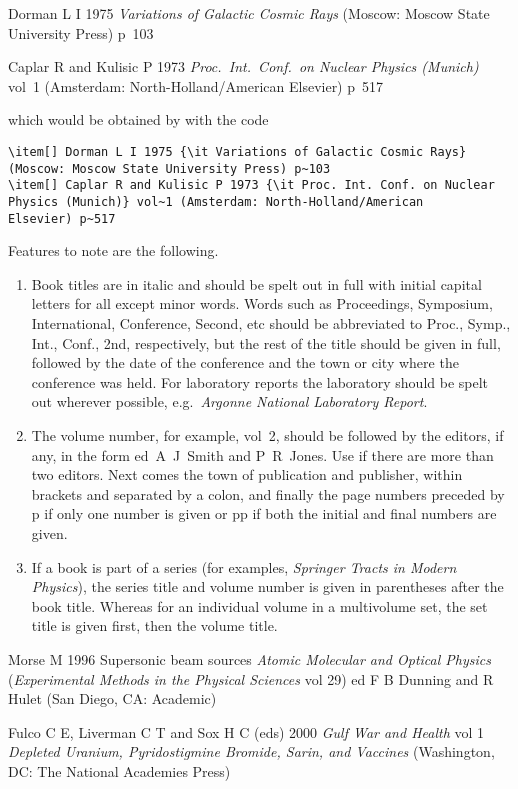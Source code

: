 \documentclass[12pt]{iopart}
\begin{document}
\smallskip
\begin{harvard}
\item[] Dorman L I 1975 {\it Variations of Galactic Cosmic Rays} 
(Moscow: Moscow State University Press) p~103
\item[] Caplar R and Kulisic P 1973 {\it Proc.\
Int.\ Conf.\ on Nuclear Physics (Munich)} vol~1 (Amsterdam:  
North-Holland/American Elsevier) p~517
\end{harvard}
\smallskip

\noindent which would be obtained by with the code
\small\begin{verbatim}
\item[] Dorman L I 1975 {\it Variations of Galactic Cosmic Rays} 
(Moscow: Moscow State University Press) p~103
\item[] Caplar R and Kulisic P 1973 {\it Proc. Int. Conf. on Nuclear 
Physics (Munich)} vol~1 (Amsterdam: North-Holland/American 
Elsevier) p~517
\end{verbatim}\normalsize
\noindent 

\noindent Features to note are the following.
\begin{enumerate}
\item Book titles are in italic and should be spelt out in full with 
initial capital letters for all except minor words. Words such as 
Proceedings, Symposium, International, Conference, Second, etc should 
be abbreviated to Proc., Symp., Int., Conf., 2nd, 
respectively, but the rest of the title should be given in full, 
followed by the date of the conference and the 
town or city where the conference was held. For 
laboratory reports the laboratory should be spelt out wherever 
possible, e.g.\ {\it Argonne National Laboratory Report}.

\item The volume number, for example, vol~2, should be followed by 
the editors, if any, in the form ed~A~J~Smith and P~R~Jones. Use 
\etal if there are more than two editors. Next comes the town of 
publication and publisher, within brackets and separated by a colon, 
and finally the page numbers preceded by p if only one number is given 
or pp if both the initial and final numbers are given.

\item If a book is part of a series (for examples, {\it Springer Tracts in Modern Physics\/}), the series title and volume number is given in parentheses after the book title. Whereas for an individual volume in a multivolume set, the set title is given first, then the volume title. 
\end{enumerate}
\smallskip
\begin{harvard}
\item[]Morse M 1996 Supersonic beam sources {\it Atomic Molecular and Optical Physics\/} ({\it Experimental Methods in the Physical Sciences\/} vol 29) ed F B Dunning and R Hulet (San Diego, CA: Academic)  
\item[]Fulco C E, Liverman C T and Sox H C (eds) 2000 {\it Gulf War and Health\/} vol 1 {\it Depleted Uranium, Pyridostigmine Bromide, Sarin, and Vaccines\/} (Washington, DC: The National Academies Press)
\end{harvard}
\end{document}

